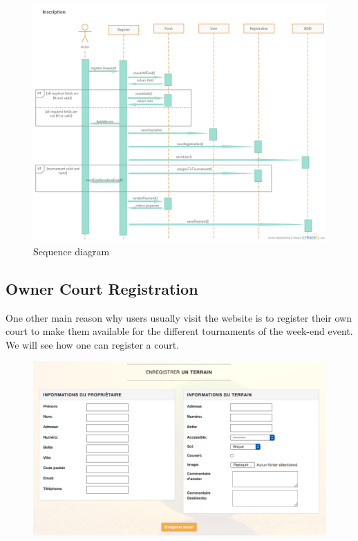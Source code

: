 \documentclass[a4paper, 12pt]{article}
\begin{document}
\begin{figure}

   \caption{\label{playerseq} Sequence diagram}
  \includegraphics[scale=0.4]{Inscription.png}
\end{figure}
\FloatBarrier
\newpage

\subsection*{Owner Court Registration}

One other main reason why users usually visit the website is to register their own court to make them available for the different tournaments of the week-end event. We will see how one can register a court.\\


\begin{figure}[h]
\includegraphics[scale=0.5]{registercourt.png}
\end{figure}
\end{document}
